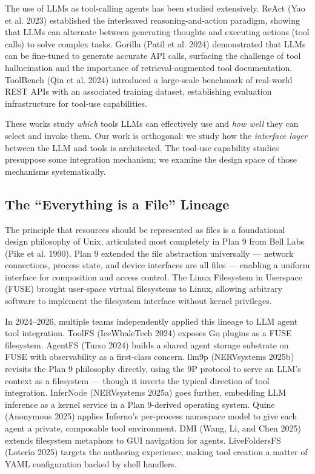 \documentclass[
  11pt,
]{article}
\begin{document}
The use of LLMs as tool-calling agents has been studied extensively.
ReAct (Yao et al. 2023) established the interleaved reasoning-and-action
paradigm, showing that LLMs can alternate between generating thoughts
and executing actions (tool calls) to solve complex tasks. Gorilla
(Patil et al. 2024) demonstrated that LLMs can be fine-tuned to generate
accurate API calls, surfacing the challenge of tool hallucination and
the importance of retrieval-augmented tool documentation. ToolBench (Qin
et al. 2024) introduced a large-scale benchmark of real-world REST APIs
with an associated training dataset, establishing evaluation
infrastructure for tool-use capabilities.

These works study \emph{which} tools LLMs can effectively use and
\emph{how well} they can select and invoke them. Our work is orthogonal:
we study how the \emph{interface layer} between the LLM and tools is
architected. The tool-use capability studies presuppose some integration
mechanism; we examine the design space of those mechanisms
systematically.

\hypertarget{the-everything-is-a-file-lineage}{%
\subsection{The ``Everything is a File''
Lineage}\label{the-everything-is-a-file-lineage}}

The principle that resources should be represented as files is a
foundational design philosophy of Unix, articulated most completely in
Plan 9 from Bell Labs (Pike et al. 1990). Plan 9 extended the file
abstraction universally --- network connections, process state, and
device interfaces are all files --- enabling a uniform interface for
composition and access control. The Linux Filesystem in Userspace (FUSE)
brought user-space virtual filesystems to Linux, allowing arbitrary
software to implement the filesystem interface without kernel
privileges.

In 2024--2026, multiple teams independently applied this lineage to LLM
agent tool integration. ToolFS (IceWhaleTech 2024) exposes Go plugins as
a FUSE filesystem. AgentFS (Turso 2024) builds a shared agent storage
substrate on FUSE with observability as a first-class concern. llm9p
(NERVsystems 2025b) revisits the Plan 9 philosophy directly, using the
9P protocol to serve an LLM's context as a filesystem --- though it
inverts the typical direction of tool integration. InferNode
(NERVsystems 2025a) goes further, embedding LLM inference as a kernel
service in a Plan 9-derived operating system. Quine (Anonymous 2025)
applies Inferno's per-process namespace model to give each agent a
private, composable tool environment. DMI (Wang, Li, and Chen 2025)
extends filesystem metaphors to GUI navigation for agents. LiveFoldersFS
(Loterio 2025) targets the authoring experience, making tool creation a
matter of YAML configuration backed by shell handlers.
\end{document}

